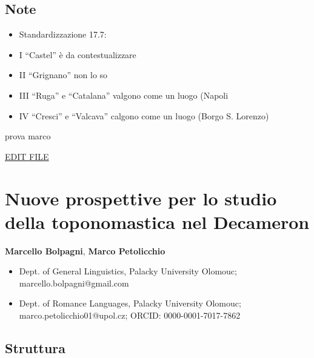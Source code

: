 \subsection{Note}\label{note}

\begin{itemize}
\item
  Standardizzazione 17.7:
\item
  I ``Castel'' è da contestualizzare
\item
  II ``Grignano'' non lo so
\item
  III ``Ruga'' e ``Catalana'' valgono come un luogo (Napoli
\item
  IV ``Cresci'' e ``Valcava'' calgono come un luogo (Borgo S. Lorenzo)
\end{itemize}

prova marco

\href{https://github.com/olablit2/geoBoccaccio/edit/master/docs/2018-article/index.md}{EDIT
FILE}

\section{Nuove prospettive per lo studio della toponomastica nel
Decameron}\label{nuove-prospettive-per-lo-studio-della-toponomastica-nel-decameron}

\textbf{Marcello Bolpagni}, \textbf{Marco Petolicchio}

\begin{itemize}
\tightlist
\item
  Dept. of General Linguistics, Palacky University Olomouc;
  marcello.bolpagni@gmail.com
\item
  Dept. of Romance Languages, Palacky University Olomouc;
  marco.petolicchio01@upol.cz; ORCID: 0000-0001-7017-7862
\end{itemize}

\subsection{Struttura}\label{struttura}

